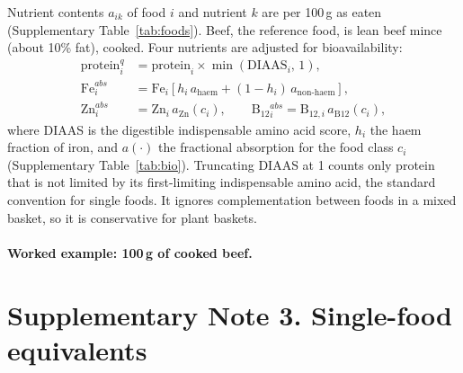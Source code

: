 \documentclass[10pt]{article}
\begin{document}
Nutrient contents $a_{ik}$ of food $i$ and nutrient $k$ are per 100\,g as eaten
(Supplementary Table~\ref{tab:foods}). Beef, the reference food, is lean beef mince
(about 10\% fat), cooked. Four nutrients are adjusted for bioavailability:
\begin{align}
\text{protein}^{q}_{i} &= \text{protein}_i \times \min(\text{DIAAS}_i,\,1), \label{eq:prot}\\
\text{Fe}^{abs}_{i} &= \text{Fe}_i \left[h_i\, a_{\mathrm{haem}} + (1-h_i)\, a_{\mathrm{non\text{-}haem}}\right], \label{eq:fe}\\
\text{Zn}^{abs}_{i} &= \text{Zn}_i\, a_{\mathrm{Zn}}(c_i), \qquad
\text{B}_{12}{}^{abs}_{i} = \text{B}_{12,i}\, a_{\mathrm{B12}}(c_i), \label{eq:zn}
\end{align}
where DIAAS is the digestible indispensable amino acid score\cite{fao2013protein},
$h_i$ the haem fraction of iron, and $a(\cdot)$ the fractional absorption for the
food class $c_i$ (Supplementary Table~\ref{tab:bio}). Truncating DIAAS at 1 counts
only protein that is not limited by its first-limiting indispensable amino acid,
the standard convention for single foods. It ignores complementation between
foods in a mixed basket, so it is conservative for plant baskets.

\begin{table}[H]
\centering\small
\caption{\textbf{Bioavailability parameters.} Central values with the range
used in sensitivity analyses.}
\label{tab:bio}

\end{table}

\paragraph{Worked example: 100\,g of cooked beef.}


\begin{table}[p]
\centering\scriptsize
\caption{\textbf{Composition of the reference beef and of the alternative foods, per 100\,g as eaten (one tablet for supplements).}
Sources are given in the last column. ``Diet'' is the food group used to define scenarios.}
\label{tab:foods}
\resizebox{\linewidth}{!}{}
\end{table}

\section{Supplementary Note 3. Single-food equivalents}
\label{si:equivalents}
\end{document}
